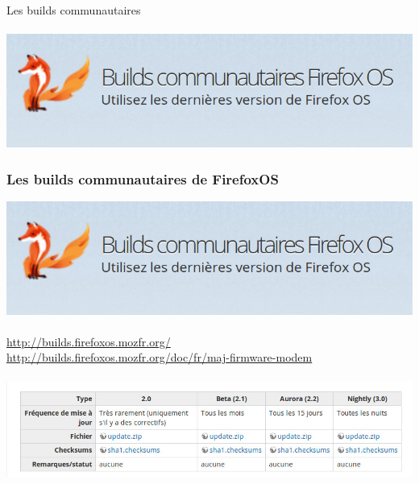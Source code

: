 \documentclass{beamer}
\begin{document}
\begin{frame}
\begin{center}
\Huge{Les builds communautaires}
\\~\\
\includegraphics[scale=0.3]{./images/builds_communautaire_logo.jpg}
\end{center}
\end{frame}
\begin{frame}
\frametitle{Les builds communautaires de FirefoxOS}
\begin{center}
\includegraphics[scale=0.3]{./images/builds_communautaire_logo.jpg}
\\~\\
\url{http://builds.firefoxos.mozfr.org/}
\\
\url{http://builds.firefoxos.mozfr.org/doc/fr/maj-firmware-modem}
\\~\\
\includegraphics[scale=0.3]{./images/builds_communautaire_01.jpg}
\end{center}
\end{frame}
\end{document}
